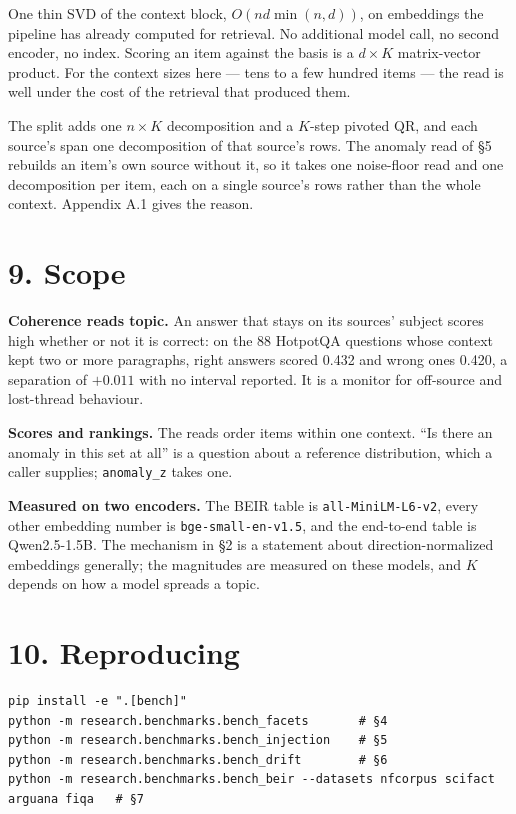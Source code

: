 \documentclass[10pt,letterpaper,twocolumn]{article}
\begin{document}
One thin SVD of the context block, \(O(n d \min(n,d))\), on embeddings the pipeline has already
computed for retrieval. No additional model call, no second encoder, no index. Scoring an item
against the basis is a \(d \times K\) matrix-vector product. For the context sizes here --- tens to
a few hundred items --- the read is well under the cost of the retrieval that produced them.

The split adds one \(n \times K\) decomposition and a \(K\)-step pivoted QR, and each source's span
one decomposition of that source's rows. The anomaly read of §5 rebuilds an item's own source
without it, so it takes one noise-floor read and one decomposition per item, each on a single
source's rows rather than the whole context. Appendix A.1 gives the reason.

\section{9. Scope}\label{9-scope}

\textbf{Coherence reads topic.} An answer that stays on its sources' subject scores high whether or
not it is correct: on the 88 HotpotQA questions whose context kept two or more paragraphs,
right answers scored 0.432 and wrong ones 0.420, a separation of \(+0.011\) with no interval reported. It is a monitor for off-source and lost-thread
behaviour.

\textbf{Scores and rankings.} The reads order items within one context. ``Is there an anomaly in this
set at all'' is a question about a reference distribution, which a caller supplies;
\texttt{anomaly\_\allowbreak{}z} takes one.

\textbf{Measured on two encoders.} The BEIR table is \texttt{all-{}\allowbreak{}MiniLM-{}\allowbreak{}L6-{}\allowbreak{}v2}, every other embedding
number is \texttt{bge-{}\allowbreak{}small-{}\allowbreak{}en-{}\allowbreak{}v1.\allowbreak{}5}, and the end-to-end table is Qwen2.5-1.5B. The mechanism in §2 is a statement about
direction-normalized embeddings generally; the magnitudes are measured on these models, and \(K\)
depends on how a model spreads a topic.

\section{10. Reproducing}\label{10-reproducing}

\begin{verbatim}
pip install -e ".[bench]"
python -m research.benchmarks.bench_facets       # §4
python -m research.benchmarks.bench_injection    # §5
python -m research.benchmarks.bench_drift        # §6
python -m research.benchmarks.bench_beir --datasets nfcorpus scifact arguana fiqa   # §7
\end{verbatim}
\end{document}
